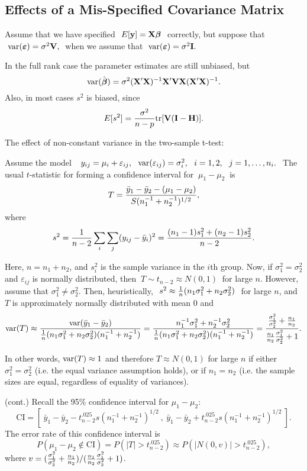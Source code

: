 \subsection{Effects of a Mis-Specified Covariance Matrix}

Assume that we have specified $\ E[\mathbf{y}] = \mathbf{X}\mbox{\boldmath $\beta$}\ $ correctly,
but suppose that $\ \mathrm{var}(\mbox{\boldmath $\varepsilon$}) = \sigma^2\mathbf{V},\ $ when we assume that
$\ \var(\bfeps)=\sigma^2\bfI.$

In the full rank case the parameter estimates
are still unbiased, but 
$$
\mathrm{var}(\hat{\mbox{\boldmath $\beta$}})
= \sigma^2(\mathbf{X}'\mathbf{X})^{-1}\mathbf{X}'\mathbf{V}\mathbf{X}(\mathbf{X}'\mathbf{X})^{-1}.
$$
Also, in most cases $s^2$ is biased, since
$$
E[s^2] = {\sigma^2\over n-p}\mathrm{tr}[\mathbf{V}(\mathbf{I}-\mathbf{H})].
$$


\bsexa
The effect of non-constant variance in the two-sample t-test:

Assume the model $\ \ y_{ij}=\mu_i+\varepsilon_{ij},\ \
\var(\varepsilon_{ij})=\sigma_i^2,\ \ i=1,2,\ \ j=1,\ldots,n_i.\ $ The
usual $t$-statistic for forming a confidence interval for
$\ \mu_1-\mu_2\ $ is
$$
T={\bar{y}_1-\bar{y}_2-(\mu_1-\mu_2)\over
	S(n_1^{-1}+n_2^{-1})^{1/2}},
$$
where
$$
s^2={1\over n-2}\sum_i\sum_j(y_{ij}-\bar{y}_i)^2
={(n_1-1)s_1^2+(n_2-1)s_2^2\over n-2}.
$$

Here, $n=n_1+n_2$, and $s_i^2$ is the sample variance in the $i$th
group.  Now, if $\sigma_1^2=\sigma_2^2$ and $\varepsilon_{ij}$ is
normally distributed, then $\ T \sim t_{n-2} \approx N(0,1)\ $ for
large $n$.  However, assume that $\sigma_1^2\neq\sigma_2^2$. Then,
heuristically, $\ s^2 \approx {1\over n}(n_1\sigma_1^2 +
n_2\sigma_2^2)\ $ for large $n$, and $T$ is approximately normally
distributed with mean 0 and
$$
\mathrm{var}(T)
\approx
{\mathrm{var}(\bar{y}_1-\bar{y}_2)\over
	{1\over n}(n_1\sigma_1^2+n_2\sigma_2^2)(n_1^{-1}+n_2^{-1})}
= {n_1^{-1}\sigma_1^2+n_2^{-1}\sigma_2^2\over
	{1\over n}(n_1\sigma_1^2+n_2\sigma_2^2)(n_1^{-1}+n_2^{-1})}
= {{\sigma_1^2\over\sigma_2^2}+{n_1\over n_2}\over
	{n_1\over n_2}{\sigma_1^2\over\sigma_2^2}+1}.
$$

In other words, $\mathrm{var}(T) \approx 1$ and therefore $T \approx N(0,1)$
for large $n$ if either $\sigma_1^2 = \sigma_2^2$ (i.e. the equal
variance assumption holds), or if $n_1 = n_2$ (i.e. the sample sizes
are equal, regardless of equality of variances).
\eexa

\bexa (cont.)
Recall the 95\% confidence interval for $\mu_1-\mu_2$:
$$
\mbox{CI} = 
[\ 
\bar{y}_1-\bar{y}_2-t_{n-2}^{.025}s(n_1^{-1}+n_2^{-1})^{1/2}\ ,\
\bar{y}_1-\bar{y}_2+t_{n-2}^{.025}s(n_1^{-1}+n_2^{-1})^{1/2}
\ ].
$$
The error rate of this confidence interval is
$$
P(\mu_1-\mu_2 \not\in \mbox{CI}) = 
P(|T|>t_{n-2}^{.025}) \approx 
P(|N(0,v)|>t_{n-2}^{.025}),
$$
where $v=({\sigma_1^2\over\sigma_2^2}+{n_1\over n_2})/ ({n_1\over
n_2}{\sigma_1^2\over\sigma_2^2}+1)$.

